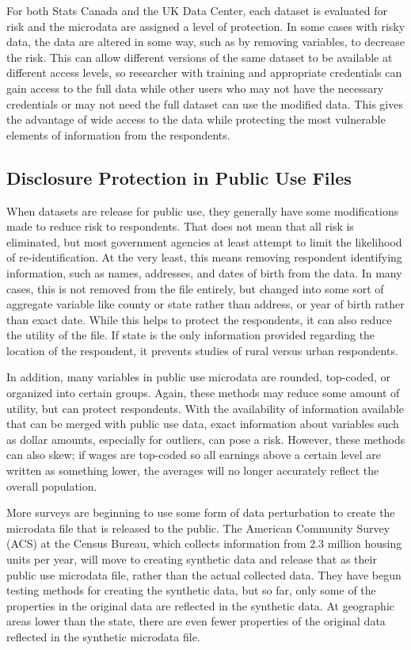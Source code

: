 For both Stats Canada and the UK Data Center, each dataset is evaluated for risk and the microdata are assigned a level of protection. In some cases with risky data, the data are altered in some way, such as by removing variables, to decrease the risk. This can allow different versions of the same dataset to be available at different access levels, so researcher with training and appropriate credentials can gain access to the full data while other users who may not have the necessary credentials or may not need the full dataset can use the modified data. This gives the advantage of wide access to the data while protecting the most vulnerable elements of information from the respondents.

\subsection{Disclosure Protection in Public Use Files}

When datasets are release for public use, they generally have some modifications made to reduce risk to respondents. That does not mean that all risk is eliminated, but most government agencies at least attempt to limit the likelihood of re-identification. At the very least, this means removing respondent identifying information, such as names, addresses, and dates of birth from the data. In many cases, this is not removed from the file entirely, but changed into some sort of aggregate variable like county or state rather than address, or year of birth rather than exact date. While this helps to protect the respondents, it can also reduce the utility of the file. If state is the only information provided regarding the location of the respondent, it prevents studies of rural versus urban respondents.

In addition, many variables in public use microdata are rounded, top-coded, or organized into certain groups. Again, these methods may reduce some amount of utility, but can protect respondents. With the availability of information available that can be merged with public use data, exact information about variables such as dollar amounts, especially for outliers, can pose a risk. However, these methods can also skew; if wages are top-coded so all earnings above a certain level are written as something lower, the averages will no longer accurately reflect the overall population.

More surveys are beginning to use some form of data perturbation to create the microdata file that is released to the public. 
The American Community Survey (ACS) at the Census Bureau, which collects information from 2.3 million housing units per year, will move to creating synthetic data and release that as their public use microdata file, rather than the actual collected data. They have begun testing methods for creating the synthetic data, but so far, only some of the properties in the original data are reflected in the synthetic data. At geographic areas lower than the state, there are even fewer properties of the original data reflected in the synthetic microdata file.

